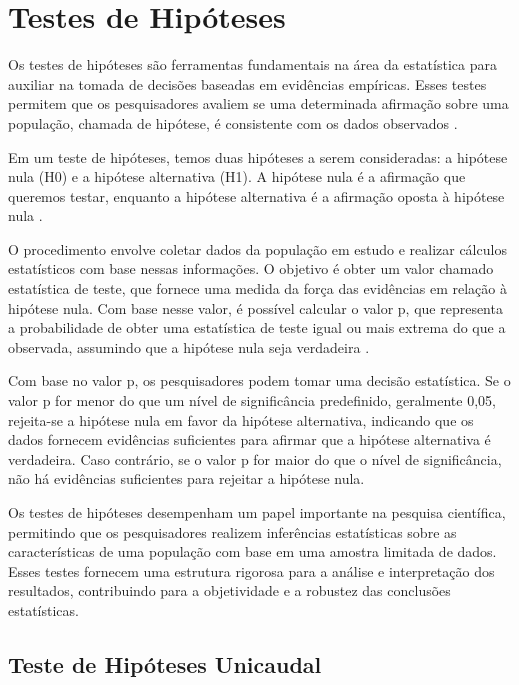 \chapter{Testes de Hipóteses}

Os testes de hipóteses são ferramentas fundamentais na área da estatística para auxiliar na tomada de decisões baseadas em evidências empíricas. Esses testes permitem que os pesquisadores avaliem se uma determinada afirmação sobre uma população, chamada de hipótese, é consistente com os dados observados \parencite{Triola2017}.

Em um teste de hipóteses, temos duas hipóteses a serem consideradas: a hipótese nula (H0) e a hipótese alternativa (H1). A hipótese nula é a afirmação que queremos testar, enquanto a hipótese alternativa é a afirmação oposta à hipótese nula \parencite{Bussab2017}.

O procedimento envolve coletar dados da população em estudo e realizar cálculos estatísticos com base nessas informações. O objetivo é obter um valor chamado estatística de teste, que fornece uma medida da força das evidências em relação à hipótese nula. Com base nesse valor, é possível calcular o valor p, que representa a probabilidade de obter uma estatística de teste igual ou mais extrema do que a observada, assumindo que a hipótese nula seja verdadeira \parencite{Magalhaes2015}.

Com base no valor p, os pesquisadores podem tomar uma decisão estatística. Se o valor p for menor do que um nível de significância predefinido, geralmente 0,05, rejeita-se a hipótese nula em favor da hipótese alternativa, indicando que os dados fornecem evidências suficientes para afirmar que a hipótese alternativa é verdadeira. Caso contrário, se o valor p for maior do que o nível de significância, não há evidências suficientes para rejeitar a hipótese nula.

Os testes de hipóteses desempenham um papel importante na pesquisa científica, permitindo que os pesquisadores realizem inferências estatísticas sobre as características de uma população com base em uma amostra limitada de dados. Esses testes fornecem uma estrutura rigorosa para a análise e interpretação dos resultados, contribuindo para a objetividade e a robustez das conclusões estatísticas.

\section{Teste de Hipóteses Unicaudal}